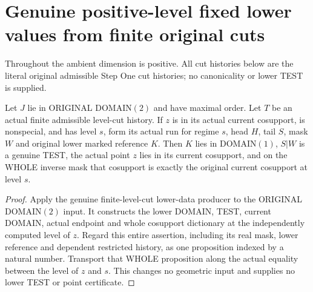 \section{Genuine positive-level fixed lower values from finite original cuts}

Throughout the ambient dimension is positive. All cut histories below are the
literal original admissible Step One cut histories; no canonicality or lower
TEST is supplied.

\begin{theorem}
\label{hir:original-finite-cut-specified-level-lower-data}
\leanok
Let $J$ lie in ORIGINAL DOMAIN$(2)$ and have maximal order. Let $T$ be an
actual finite admissible level-cut history. If $z$ is in its actual current
cosupport, is nonspecial, and has level $s$, form its actual run for regime
$s$, head $H$, tail $S$, mask $W$ and original lower marked reference $K$.
Then $K$ lies in DOMAIN$(1)$, $S|W$ is a genuine TEST, the actual point $z$
lies in its current cosupport, and on the WHOLE inverse mask that cosupport
is exactly the original current cosupport at level $s$.
\end{theorem}
\begin{proof}
Apply the genuine finite-level-cut lower-data producer to the ORIGINAL
DOMAIN$(2)$ input. It constructs the lower DOMAIN, TEST, current DOMAIN,
actual endpoint and whole cosupport dictionary at the independently computed
level of $z$. Regard this entire assertion, including its real mask, lower
reference and dependent restricted history, as one proposition indexed by a
natural number. Transport that WHOLE proposition along the actual equality
between the level of $z$ and $s$. This changes no geometric input and supplies
no lower TEST or point certificate.
\end{proof}


